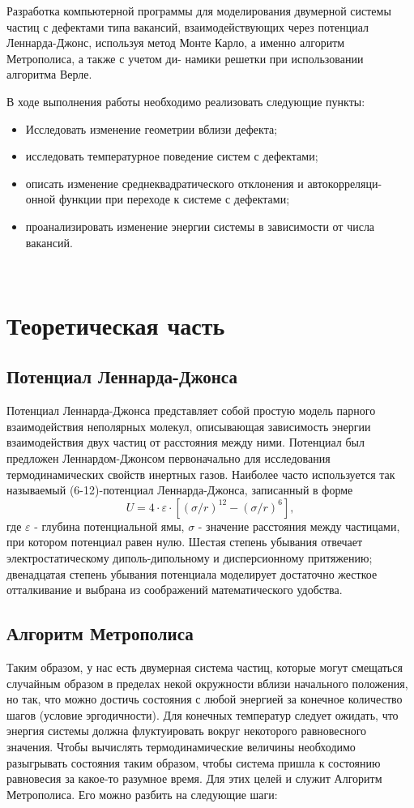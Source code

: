 \documentclass[14pt,a4paper,report]{ncc}
\begin{document}
Разработка компьютерной программы для моделирования двумерной системы частиц с дефектами типа вакансий, взаимодействующих через потенциал Леннарда-Джонс, используя метод Монте Карло, а именно алгоритм Метрополиса, а также с учетом ди-
намики решетки при использовании  алгоритма Верле.
\

В ходе выполнения работы необходимо реализовать следующие пункты:
\begin{itemize}
\item Исследовать изменение геометрии вблизи дефекта;
\item исследовать температурное поведение систем с дефектами;
\item описать изменение среднеквадратического отклонения и автокорреляци-
онной функции при переходе к системе с дефектами;
\item проанализировать изменение энергии системы в зависимости от числа
вакансий.
\end{itemize}

\

\newpage\section{Теоретическая часть }
\subsection{Потенциал Леннарда-Джонса}
Потенциал Леннарда-Джонса представляет собой простую модель парного взаимодействия неполярных молекул, описывающая зависимость энергии взаимодействия двух частиц от расстояния между ними.
Потенциал был предложен Леннардом-Джонсом первоначально для исследования термодинамических свойств инертных газов. Наиболее часто используется так называемый (6-12)-потенциал Леннарда-Джонса, записанный в форме 
\
\begin{equation}
 U = 4 \cdot \varepsilon \cdot [(\sigma/r)^{12} - (\sigma/r)^{6}  ] ,
 \end{equation} 
где $\varepsilon$ - глубина потенциальной ямы, $\sigma$ - значение расстояния между частицами, при котором потенциал равен нулю. Шестая степень убывания отвечает электростатическому диполь-дипольному и дисперсионному притяжению; двенадцатая степень убывания потенциала моделирует достаточно жесткое отталкивание и выбрана из соображений математического удобства.
\
\subsection{Алгоритм Метрополиса}
Таким образом, у нас есть двумерная система частиц, которые могут смещаться случайным образом в пределах некой окружности вблизи начального положения, но так, что можно достичь состояния с любой энергией за конечное количество шагов (условие эргодичности). Для конечных температур следует ожидать, что энергия системы должна флуктуировать вокруг некоторого равновесного значения. Чтобы вычислять термодинамические величины необходимо разыгрывать состояния таким образом, чтобы система пришла к состоянию равновесия за какое-то разумное время. Для этих целей и служит Алгоритм Метрополиса. Его можно разбить на следующие шаги:
\end{document}
